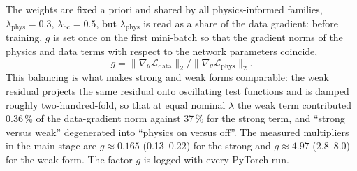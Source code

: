 \documentclass[subscriptcorrection,upint,varvw,barcolor=Goldenrod3,mathalfa=cal=euler,balance,hyphenate,french,pdf-a]{asmejour} %
\begin{document}
The weights are fixed a priori and shared by all physics-informed families,
$\lambda_{\mathrm{phys}}=0.3$, $\lambda_{\mathrm{bc}}=0.5$,
but $\lambda_{\mathrm{phys}}$ is read as a share of the data gradient: before
training, $g$ is set once on the first mini-batch so that the gradient norms of
the physics and data terms with respect to the network parameters coincide,
\begin{equation}
  g = \lVert\nabla_{\theta}\mathcal{L}_{\mathrm{data}}\rVert_2 \big/
      \lVert\nabla_{\theta}\mathcal{L}_{\mathrm{phys}}\rVert_2 .
  \label{eq:calib}
\end{equation}
This balancing \citep{wang2022} is what makes strong and weak
forms comparable: the weak residual projects the same residual onto oscillating
test functions and is damped roughly two-hundred-fold, so that at equal nominal
$\lambda$ the weak term contributed 0.36\,\% of the data-gradient norm against
37\,\% for the strong term, and ``strong versus weak'' degenerated into ``physics
on versus off''.
The measured multipliers in the main stage are $g\approx0.165$ (0.13--0.22) for
the strong and $g\approx4.97$ (2.8--8.0) for the weak form. The factor $g$ is logged with
every PyTorch run.
\end{document}
